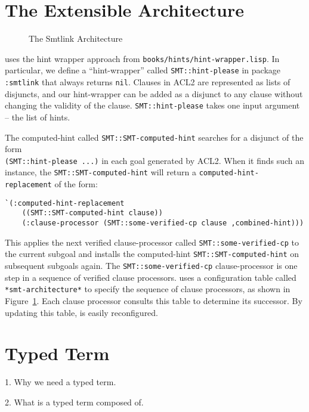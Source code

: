 \section{The Extensible Architecture}
\begin{figure}\begin{center}
  \resizebox{1.0\textwidth}{!}{}
  \caption{The Smtlink Architecture}\label{fig:arch}
\end{center}\end{figure}

\smtlink{} uses the hint wrapper approach from
\texttt{books/hints/hint-wrapper.lisp}.
In particular, we define a ``hint-wrapper'' called \texttt{SMT::hint-please} in
package \texttt{:smtlink} that always returns \texttt{nil}.
Clauses in ACL2 are represented as lists of disjuncts, and our hint-wrapper
can be added as a disjunct to any clause without changing the validity of the
clause.
\texttt{SMT::hint-please} takes one input argument -- the list of hints.

The computed-hint called \texttt{SMT::SMT-computed-hint} searches for a
disjunct of the form \\
\texttt{(SMT::hint-please ...)} in each goal generated by ACL2.
When it finds such an instance, the \texttt{SMT::SMT-computed-hint}
will return a \texttt{computed-hint-replacement} of the form:
\begin{lstlisting}[style=codestyle]
  `(:computed-hint-replacement
    ((SMT::SMT-computed-hint clause))
    (:clause-processor (SMT::some-verified-cp clause ,combined-hint)))
\end{lstlisting}
This applies the next verified clause-processor called
\texttt{SMT::some-verified-cp} to the current subgoal and installs the
computed-hint \texttt{SMT::SMT-computed-hint} on subsequent subgoals again.
The \texttt{SMT::some-verified-cp} clause-processor is one step in a sequence of
verified clause processors.
\smtlink{} uses a configuration table called \texttt{*smt-architecture*} to
specify the sequence of clause processors, as shown in Figure~\ref{fig:arch}.
Each clause processor consults this table to determine its successor.
By updating this table, \smtlink{} is easily reconfigured.

\section{Typed Term}
1. Why we need a typed term.

2. What is a typed term composed of.

